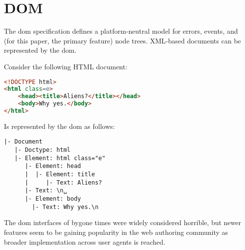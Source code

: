 
\chapter{DOM}\label{appendix-c-dom}

The \gls{dom} specification defines a platform-neutral model for errors,
events, and (for this paper, the primary feature) node trees. XML-based
documents can be represented by the \gls{dom}.

Consider the following HTML document:

\begin{lstlisting}[language=HTML]
<!DOCTYPE html>
<html class=e>
    <head><title>Aliens?</title></head>
    <body>Why yes.</body>
</html>
\end{lstlisting}

Is represented by the \gls{dom} as follows:

\begin{lstlisting}
|- Document
   |- Doctype: html
   |- Element: html class="e"
      |- Element: head
      |  |- Element: title
      |     |- Text: Aliens?
      |- Text: \n␣
      |- Element: body
        |- Text: Why yes.\n
\end{lstlisting}

The \gls{dom} interfaces of bygone times were widely considered horrible,
but newer features seem to be gaining popularity in the web authoring
community as broader implementation across user agents is reached.
